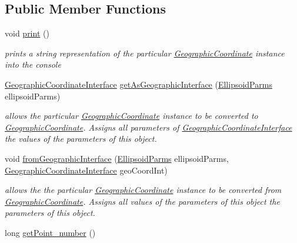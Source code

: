\subsection*{Public Member Functions}
\begin{DoxyCompactItemize}
\item 
void \hyperlink{classcoordinates_1_1_geographic_coordinate_a1cbf537f61d51979a831b2f018d28897}{print} ()
\begin{DoxyCompactList}\small\item\em prints a string representation of the particular \hyperlink{classcoordinates_1_1_geographic_coordinate}{Geographic\+Coordinate} instance into the console \end{DoxyCompactList}\item 
\hyperlink{classcoordinates_1_1_geographic_coordinate_interface}{Geographic\+Coordinate\+Interface} \hyperlink{classcoordinates_1_1_geographic_coordinate_ae316c889f13670bd69d621858495e2f3}{get\+As\+Geographic\+Interface} (\hyperlink{classparams_1_1_ellipsoid_parms}{Ellipsoid\+Parms} ellipsoid\+Parms)
\begin{DoxyCompactList}\small\item\em allows the particular \hyperlink{classcoordinates_1_1_geographic_coordinate}{Geographic\+Coordinate} instance to be converted to \hyperlink{classcoordinates_1_1_geographic_coordinate}{Geographic\+Coordinate}. Assigns all parameters of \hyperlink{classcoordinates_1_1_geographic_coordinate_interface}{Geographic\+Coordinate\+Interface} the values of the parameters of this object. \end{DoxyCompactList}\item 
void \hyperlink{classcoordinates_1_1_geographic_coordinate_ab5be730c1eee8c9a267f8fcd8fabaf69}{from\+Geographic\+Interface} (\hyperlink{classparams_1_1_ellipsoid_parms}{Ellipsoid\+Parms} ellipsoid\+Parms, \hyperlink{classcoordinates_1_1_geographic_coordinate_interface}{Geographic\+Coordinate\+Interface} geo\+Coord\+Int)
\begin{DoxyCompactList}\small\item\em allows the the particular \hyperlink{classcoordinates_1_1_geographic_coordinate}{Geographic\+Coordinate} instance to be converted from \hyperlink{classcoordinates_1_1_geographic_coordinate}{Geographic\+Coordinate}. Assigns all values of the parameters of this object the parameters of this object. \end{DoxyCompactList}\item 
long \hyperlink{classcoordinates_1_1_geographic_coordinate_a68208a97e0db4620dce1163bafdcab06}{get\+Point\+\_\+number} ()

\end{DoxyCompactItemize}
